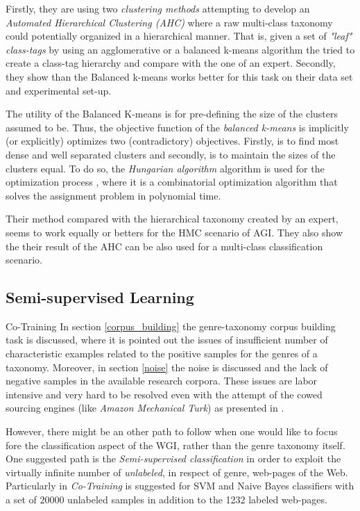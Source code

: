 Firstly, they are using two \textit{clustering methods} attempting to develop an \textit{Automated Hierarchical Clustering (AHC)} where a raw multi-class taxonomy could potentially organized in a hierarchical manner. That is, given a set of  \textit{"leaf" class-tags} by using an agglomerative or a balanced k-means algorithm the tried to create a class-tag hierarchy and compare with the one of an expert. Secondly, they show than the Balanced k-means works better for this task on their data set and experimental set-up.

The utility of the Balanced K-means is for pre-defining the size of the clusters assumed to be. Thus, the objective function of the \textit{balanced k-means} is implicitly (or explicitly) optimizes two (contradictory) objectives. Firstly, is to find most dense and well separated clusters and secondly, is to maintain the sizes of the clusters equal. To do so, the \textit{Hungarian algorithm} algorithm is used for the optimization process \parencite{malinen2014balanced}, where it is a combinatorial optimization algorithm that solves the assignment problem in polynomial time.

Their method compared with the hierarchical taxonomy created by an expert, seems to work equally or betters for the HMC scenario of AGI. They also show the their result of the AHC can be also used for  a multi-class classification scenario.

\subsection{Semi-supervised Learning} 

Co-Training In section \ref{corpus_building} the genre-taxonomy corpus building task is discussed, where it is pointed out the issues of insufficient number of characteristic examples related to the positive samples for the genres of a taxonomy. Moreover, in section \ref{noise} the noise is discussed and the lack of negative samples in the available research corpora. These issues are labor intensive and very hard to be resolved even with the attempt of the cowed sourcing engines (like \textit{Amazon Mechanical Turk}) as presented in \parencite{Asheghi's relative work}. 

However, there might be an other path to follow when one would like to focus fore the classification aspect of the WGI, rather than the genre taxonomy itself. One suggested path is the \textit{Semi-supervised classification} in order to exploit the virtually infinite number of \textit{unlabeled}, in respect of genre, web-pages of the Web. Particularly in \parencite{chetry2011web}\textit{ Co-Training} is suggested for SVM and Naive Bayes classifiers with a set of $20000$ unlabeled samples in addition to the 1232 labeled web-pages.

